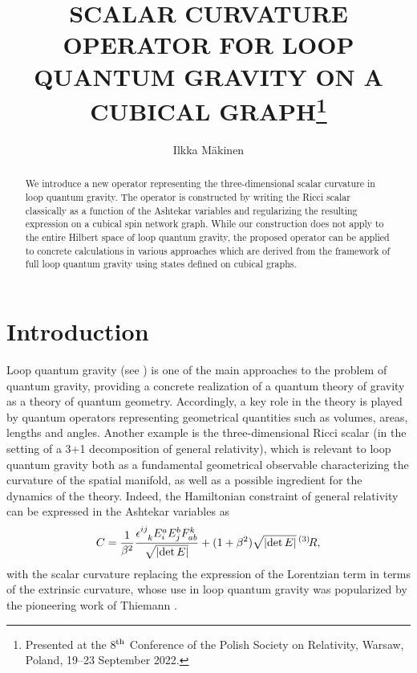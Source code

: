 \documentclass{appolb_edited}
\newcommand{\updown}[2]{^{#1}_{\phantom{#1}#2}}
\newcommand{\Rt}{\,{}^{(3)}\!R}
\newcommand{\de}{{\rm det}\,E}
\begin{document}
\title{SCALAR CURVATURE OPERATOR FOR LOOP QUANTUM GRAVITY ON A CUBICAL GRAPH\thanks{Presented at the 8$^{\rm th}$ Conference of the Polish Society on Relativity, Warsaw, Poland, 19--23 September 2022.}%
}
\author{Ilkka M\"akinen
	\address{National Centre for Nuclear Research, Pasteura 7, 02-093 Warsaw, Poland \\[1ex]
	Faculty of Physics, University of Warsaw, Pasteura 5, 02-093 Warsaw, Poland \\[1ex]
	\texttt{ilkka.makinen@ncbj.gov.pl}}
}

\maketitle

\begin{abstract}
	We introduce a new operator representing the three-dimensional scalar curvature in loop quantum gravity. The operator is constructed by writing the Ricci scalar classically as a function of the Ashtekar variables and regularizing the resulting expression on a cubical spin network graph. While our construction does not apply to the entire Hilbert space of loop quantum gravity, the proposed operator can be applied to concrete calculations in various approaches which are derived from the framework of full loop quantum gravity using states defined on cubical graphs.
\end{abstract}

\section{Introduction}

Loop quantum gravity (see \eg \cite{Ashtekar:2017yom, Rovelli:2004tv, Thiemann:2007pyv}) is one of the main approaches to the problem of quantum gravity, providing a concrete realization of a quantum theory of gravity as a theory of quantum geometry. Accordingly, a key role in the theory is played by quantum operators representing geometrical quantities such as volumes, areas, lengths and angles. Another example is the three-dimensional Ricci scalar (in the setting of a 3+1 decomposition of general relativity), which is relevant to loop quantum gravity both as a fundamental geometrical observable characterizing the curvature of the spatial manifold, as well as a possible ingredient for the dynamics of the theory. Indeed, the Hamiltonian constraint of general relativity can be expressed in the Ashtekar variables \cite{Ashtekar:1987gu, BarberoG:1994eia} as
\begin{equation}
	C = \frac{1}{\beta^2}\frac{\epsilon\updown{ij}{k}E^a_iE^b_jF_{ab}^k}{\sqrt{|\de|}} + (1+\beta^2)\sqrt{|\de|}\Rt,
	\label{C_new}
\end{equation}
with the scalar curvature replacing the expression of the Lorentzian term in terms of the extrinsic curvature, whose use in loop quantum gravity was popularized by the pioneering work of Thiemann \cite{Thiemann:1996aw}.
\end{document}

